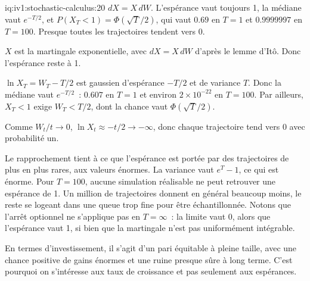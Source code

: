 \begin{solution}{iq:iv1:stochastic-calculus:20}
$dX = X\,dW$. L'espérance vaut toujours 1, la médiane vaut $e^{-T/2}$, et $P(X_T < 1) = \Phi(\sqrt{T}/2)$, qui vaut $0.69$ en $T = 1$ et $0.9999997$ en $T = 100$. Presque toutes les trajectoires tendent vers 0.

$X$ est la martingale exponentielle, avec $dX = X\,dW$ d'après le lemme d'Itô. Donc l'espérance reste à 1.

$\ln X_T = W_T - T/2$ est gaussien d'espérance $-T/2$ et de variance $T$. Donc la médiane vaut $e^{-T/2}$~: $0.607$ en $T = 1$ et environ $2 \times 10^{-22}$ en $T = 100$. Par ailleurs, $X_T < 1$ exige $W_T < T/2$, dont la chance vaut $\Phi(\sqrt{T}/2)$.

Comme $W_t/t \to 0$, $\ln X_t \approx -t/2 \to -\infty$, donc chaque trajectoire tend vers 0 avec probabilité un.

Le rapprochement tient à ce que l'espérance est portée par des trajectoires de plus en plus rares, aux valeurs énormes. La variance vaut $e^T - 1$, ce qui est énorme. Pour $T = 100$, aucune simulation réalisable ne peut retrouver une espérance de 1. Un million de trajectoires donnent en général beaucoup moins, le reste se logeant dans une queue trop fine pour être échantillonnée. Notons que l'arrêt optionnel ne s'applique pas en $T = \infty$~: la limite vaut 0, alors que l'espérance vaut 1, si bien que la martingale n'est pas uniformément intégrable.

En termes d'investissement, il s'agit d'un pari équitable à pleine taille, avec une chance positive de gains énormes et une ruine presque sûre à long terme. C'est pourquoi on s'intéresse aux taux de croissance et pas seulement aux espérances.



\end{solution}

